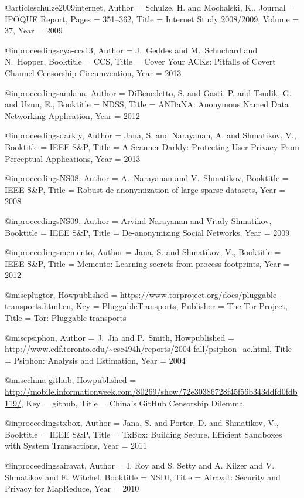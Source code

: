 {{{{{{{	@article{schulze2009internet,
	Author = {Schulze, H. and Mochalski, K.},
	Journal = {IPOQUE Report},
	Pages = {351--362},
	Title = {Internet Study 2008/2009},
	Volume = {37},
	Year = {2009}}
	
	@inproceedings{cya-ccs13,
	Author = {J.~Geddes and M.~Schuchard and N.~Hopper},
	Booktitle = {{CCS}},
	Title = {{Cover Your ACKs: Pitfalls of Covert Channel Censorship Circumvention}},
	Year = {2013}}
	
	@inproceedings{andana,
	Author = {DiBenedetto, S. and Gasti, P. and Tsudik, G. and Uzun, E.},
	Booktitle = {{NDSS}},
	Title = {{ANDaNA: Anonymous Named Data Networking Application}},
	Year = {2012}}
	
	@inproceedings{darkly,
	Author = {Jana, S. and Narayanan, A. and Shmatikov, V.},
	Booktitle = {IEEE S\&P},
	Title = {{A Scanner Darkly: Protecting User Privacy From Perceptual Applications}},
	Year = {2013}}
	
	@inproceedings{NS08,
	Author = {A.~Narayanan and V.~Shmatikov},
	Booktitle = {IEEE S\&P},
	Title = {Robust de-anonymization of large sparse datasets},
	Year = {2008}}
	
	@inproceedings{NS09,
	Author = {Arvind Narayanan and Vitaly Shmatikov},
	Booktitle = {IEEE S\&P},
	Title = {De-anonymizing Social Networks},
	Year = {2009}}
	
	@inproceedings{memento,
	Author = {Jana, S. and Shmatikov, V.},
	Booktitle = {IEEE S\&P},
	Title = {{Memento: Learning secrets from process footprints}},
	Year = {2012}}
	
	@misc{plugtor,
	Howpublished = {\url{https://www.torproject.org/docs/pluggable-transports.html.en}},
	Key = {PluggableTransports},
	Publisher = {The Tor Project},
	Title = {{Tor: Pluggable transports}}}
	
	@misc{psiphon,
	Author = {J.~Jia and P.~Smith},
	Howpublished = {\url{http://www.cdf.toronto.edu/~csc494h/reports/2004-fall/psiphon_ae.html}},
	Title = {{Psiphon: Analysis and Estimation}},
	Year = 2004}
	
	@misc{china-github,
	Howpublished = {\url{http://mobile.informationweek.com/80269/show/72e30386728f45f56b343ddfd0fdb119/}},
	Key = {github},
	Title = {{China's GitHub Censorship Dilemma}}}
	
	@inproceedings{txbox,
	Author = {Jana, S. and Porter, D. and Shmatikov, V.},
	Booktitle = {IEEE S\&P},
	Title = {{TxBox: Building Secure, Efficient Sandboxes with System Transactions}},
	Year = {2011}}
	
	@inproceedings{airavat,
	Author = {I. Roy and S. Setty and A. Kilzer and V. Shmatikov and E. Witchel},
	Booktitle = {NSDI},
	Title = {{Airavat: Security and Privacy for MapReduce}},
	Year = {2010}}
	
}}}}}}}
